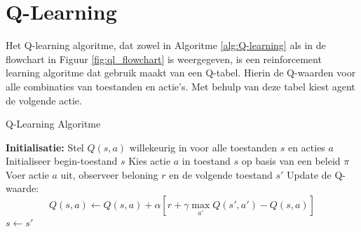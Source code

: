\documentclass[a4paper,12pt]{report}
\begin{document}
\section{Q-Learning}

Het Q-learning algoritme, dat zowel in Algoritme \ref{alg:Q-learning} als in de
flowchart in Figuur \ref{fig:ql_flowchart} is weergegeven, is een reinforcement
learning algoritme dat gebruik maakt van een Q-tabel. Hierin de Q-waarden voor
alle combinaties van toestanden en actie's. Met behulp van deze tabel kiest
agent de volgende actie.

\begin{algorithm}
    \caption{Q-Learning Algoritme}\label{alg:Q-learning}
    \begin{algorithmic}
        \State \textbf{Initialisatie:} Stel $Q(s, a)$ willekeurig in voor alle toestanden $s$ en acties $a$
        \State Initialiseer begin-toestand $s$
        \State Kies actie $a$ in toestand $s$ op basis van een beleid $\pi$
        \State Voer actie $a$ uit, observeer beloning $r$ en de volgende toestand $s'$
        \State Update de Q-waarde:
        \[
            Q(s, a) \gets Q(s, a) + \alpha \left[ r + \gamma \max_{a'} Q(s', a') - Q(s, a) \right]
        \]
        \State $s \gets s'$
        \EndWhile
        \EndFor
    \end{algorithmic}
\end{algorithm}
\end{document}
